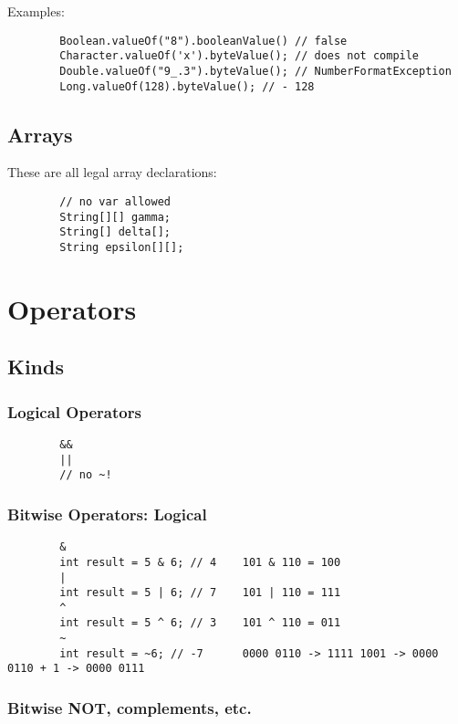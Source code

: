 \documentclass{scrartcl}
\begin{document}
    Examples:
    \begin{lstlisting}
        Boolean.valueOf("8").booleanValue() // false
        Character.valueOf('x').byteValue(); // does not compile
        Double.valueOf("9_.3").byteValue(); // NumberFormatException
        Long.valueOf(128).byteValue(); // - 128
    \end{lstlisting}

\subsection{Arrays}

    These are all legal array declarations:

    \begin{lstlisting}
        // no var allowed
        String[][] gamma;
        String[] delta[];
        String epsilon[][];
    \end{lstlisting}

\section{Operators}
\subsection{Kinds}
\subsubsection{Logical Operators}
    \begin{lstlisting}
        &&
        ||
        // no ~!
    \end{lstlisting}

\subsubsection{Bitwise Operators: Logical}
    \begin{lstlisting}
        &
        int result = 5 & 6; // 4    101 & 110 = 100
        |
        int result = 5 | 6; // 7    101 | 110 = 111
        ^
        int result = 5 ^ 6; // 3    101 ^ 110 = 011
        ~
        int result = ~6; // -7      0000 0110 -> 1111 1001 -> 0000 0110 + 1 -> 0000 0111
    \end{lstlisting}

    \subsubsection{Bitwise NOT, complements, etc.}
\end{document}
